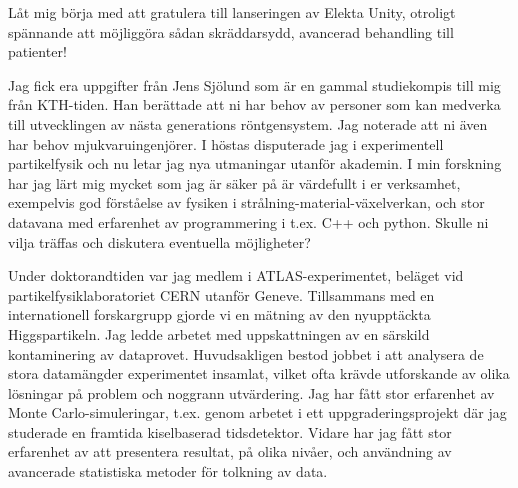 \documentclass[11pt, a4paper]{../awesome-cv} %
\begin{document}
\sloppy %

\makecvheader %

\makelettertitle %


\begin{cvletter}
\vspace{.2cm}
Låt mig börja med att gratulera till lanseringen av Elekta Unity, otroligt spännande att möjliggöra sådan skräddarsydd, avancerad behandling till patienter!

Jag fick era uppgifter från Jens Sjölund som är en gammal studiekompis till mig från KTH-tiden.
Han berättade att ni har behov av personer som kan medverka till utvecklingen av nästa generations röntgensystem.
Jag noterade att ni även har behov mjukvaruingenjörer.
I höstas disputerade jag i experimentell partikelfysik och nu letar jag nya utmaningar utanför akademin. %
I min forskning har jag lärt mig mycket som jag är säker på är värdefullt i er verksamhet, exempelvis god förståelse av fysiken i strålning-material-växelverkan, och stor datavana med erfarenhet av programmering i t.ex. C++ och python. 
Skulle ni vilja träffas och diskutera eventuella möjligheter?

Under doktorandtiden var jag medlem i ATLAS-experimentet, beläget vid partikelfysiklaboratoriet CERN utanför Geneve.
Tillsammans med en internationell forskargrupp gjorde vi en mätning av den nyupptäckta Higgspartikeln. 
Jag ledde arbetet med uppskattningen av en särskild kontaminering av dataprovet.
Huvudsakligen bestod jobbet i att analysera de stora datamängder experimentet insamlat, %
vilket ofta krävde utforskande av olika lösningar på problem och noggrann utvärdering. 
Jag har fått stor erfarenhet av Monte Carlo-simuleringar, t.ex. genom arbetet i ett uppgraderingsprojekt där jag studerade en framtida kiselbaserad tidsdetektor.
Vidare har jag fått stor erfarenhet av att presentera resultat, på olika nivåer, och användning av avancerade statistiska metoder för tolkning av data.


\end{cvletter}
\end{document}
